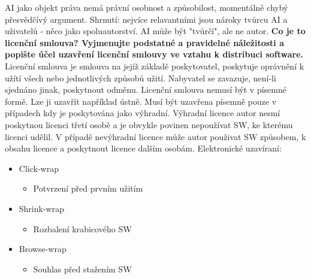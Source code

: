 \documentclass[12pt,a4paper,czech]{report}
\newcommand{\nadpis}[1]{\noindent\textbf{\Large{#1}}\normalsize}
\begin{document}
AI jako objekt práva nemá právní osobnost a způsobilost, momentálně chybý přesvědčívý argument. 
Shrnutí: nejvíce relavantními jsou nároky tvůrcu AI a uživatelů - něco jako spoluautorství. AI může být "tvůrčí", ale ne autor.
\newline
\newline
\nadpis{Co je to licenční smlouva? Vyjmenujte podstatné a pravidelné náležitosti a popište účel uzavření licenční smlouvy ve vztahu k distribuci software.}
\newline
\newline
Licenční smlouva je smlouva na jejíž základě poskytovatel, poskytuje oprávnění k užítí všech nebo jednotlivých způsobů užití. Nabyvatel se zavazuje, není-li sjednáno jinak, poskytnout odměnu. 
Licenční smlouva nemusí být v písemné formě. Lze ji uzavřít například ústně. Musí být uzavřena písemně pouze v případech kdy je poskytována jako výhradní. Výhradní licence autor nesmí poskytnou licenci třetí osobě a je obvykle povinen nepoužívat SW, ke kterému licenci udělil. V případě nevýhradní licence může autor použivat SW způsobem, k obsahu licence a poskytnout licence dalším osobám. 
Elektronické uzavíraní:
\begin{itemize}
    \item Click-wrap
  \begin{itemize}
      \item Potvrzení před prvním užitím
  \end{itemize}
  \item Shrink-wrap
  \begin{itemize}
      \item Rozbalení krabicového SW
  \end{itemize}
  \item Browse-wrap
  \begin{itemize}
      \item Souhlas před stažením SW
  \end{itemize}
\end{itemize}
  
\end{document}
